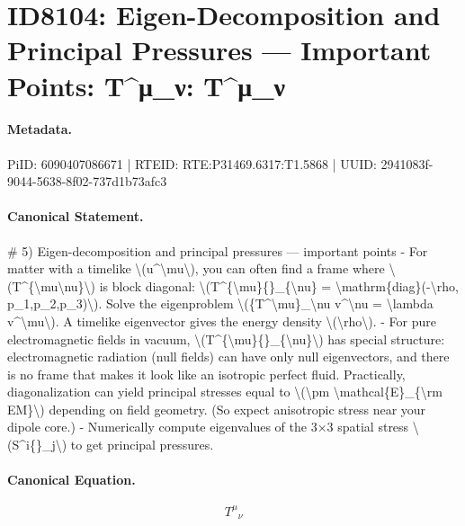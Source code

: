 \section*{ID8104: Eigen-Decomposition and Principal Pressures — Important Points: T\textasciicircum{}μ\_ν: T\textasciicircum{}μ\_ν}
\paragraph{Metadata.}
PiID: 6090407086671 | RTEID: RTE:P31469.6317:T1.5868 | UUID: 2941083f-9044-5638-8f02-737d1b73afc3

\paragraph{Canonical Statement.}
\# 5) Eigen-decomposition and principal pressures — important points - For matter with a timelike \textbackslash{}(u\textasciicircum{}\textbackslash{}mu\textbackslash{}), you can often find a frame where \textbackslash{}(T\textasciicircum{}\{\textbackslash{}mu\textbackslash{}nu\}\textbackslash{}) is block diagonal: \textbackslash{}(T\textasciicircum{}\{\textbackslash{}mu\}\{\}\_\{\textbackslash{}nu\} = \textbackslash{}mathrm\{diag\}(-\textbackslash{}rho, p\_1,p\_2,p\_3)\textbackslash{}). Solve the eigenproblem \textbackslash{}(\{T\textasciicircum{}\textbackslash{}mu\}\_\textbackslash{}nu v\textasciicircum{}\textbackslash{}nu = \textbackslash{}lambda v\textasciicircum{}\textbackslash{}mu\textbackslash{}). A timelike eigenvector gives the energy density \textbackslash{}(\textbackslash{}rho\textbackslash{}). - For pure electromagnetic fields in vacuum, \textbackslash{}(T\textasciicircum{}\{\textbackslash{}mu\}\{\}\_\{\textbackslash{}nu\}\textbackslash{}) has special structure: electromagnetic radiation (null fields) can have only null eigenvectors, and there is no frame that makes it look like an isotropic perfect fluid. Practically, diagonalization can yield principal stresses equal to \textbackslash{}(\textbackslash{}pm \textbackslash{}mathcal\{E\}\_\{\textbackslash{}rm EM\}\textbackslash{}) depending on field geometry. (So expect anisotropic stress near your dipole core.) - Numerically compute eigenvalues of the 3×3 spatial stress \textbackslash{}(S\textasciicircum{}i\{\}\_j\textbackslash{}) to get principal pressures.

\paragraph{Canonical Equation.}
\[
T^{\mu}{}_{\nu}
\]

